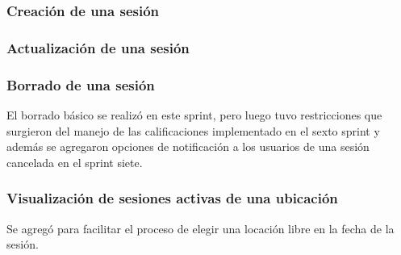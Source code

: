 \subsubsection{Creación de una sesión}

\subsubsection {Actualización de una sesión}

\subsubsection{Borrado de una sesión}

El borrado básico se realizó en este sprint, pero luego tuvo restricciones que surgieron del manejo de las calificaciones implementado en el sexto sprint y además se agregaron opciones de notificación a los usuarios de una sesión cancelada en el sprint siete. 

\subsubsection{Visualización de sesiones activas de una ubicación}

Se agregó para facilitar el proceso de elegir una locación libre en la fecha de la sesión.



